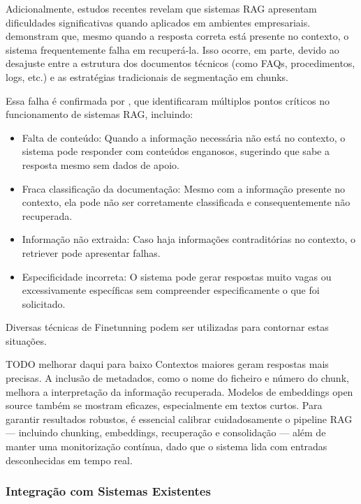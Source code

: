 Adicionalmente, estudos recentes revelam que sistemas RAG apresentam dificuldades significativas quando aplicados em ambientes empresariais. \textcite{RAGDoesNotWork2024} demonstram que, mesmo quando a resposta correta está presente no contexto, o sistema frequentemente falha em recuperá-la. Isso ocorre, em parte, devido ao desajuste entre a estrutura dos documentos técnicos (como FAQs, procedimentos, logs, etc.) e as estratégias tradicionais de segmentação em chunks.

Essa falha é confirmada por \textcite{SevenPoints2024}, que identificaram múltiplos pontos críticos no funcionamento de sistemas RAG, incluindo:

\begin{itemize}
    \item Falta de conteúdo: Quando a informação necessária não está no contexto, o sistema pode responder com conteúdos enganosos, sugerindo que sabe a resposta mesmo sem dados de apoio.
    \item Fraca classificação da documentação: Mesmo com a informação presente no contexto, ela pode não ser corretamente classificada e consequentemente não recuperada. 
 \item Informação não extraida: Caso haja informações contraditórias no contexto, o retriever pode apresentar falhas.
  \item Especificidade incorreta: O sistema pode gerar respostas muito vagas ou excessivamente específicas sem compreender especificamente o que foi solicitado.
\end{itemize}

Diversas técnicas de Finetunning podem ser utilizadas para contornar estas situações.

TODO melhorar daqui para baixo
Contextos maiores geram respostas mais precisas. A inclusão de metadados, como o nome do ficheiro e número do chunk, melhora a interpretação da informação recuperada. Modelos de embeddings open source também se mostram eficazes, especialmente em textos curtos. Para garantir resultados robustos, é essencial calibrar cuidadosamente o pipeline RAG — incluindo chunking, embeddings, recuperação e consolidação — além de manter uma monitorização contínua, dado que o sistema lida com entradas desconhecidas em tempo real.



\subsubsection{Integração com Sistemas Existentes}




